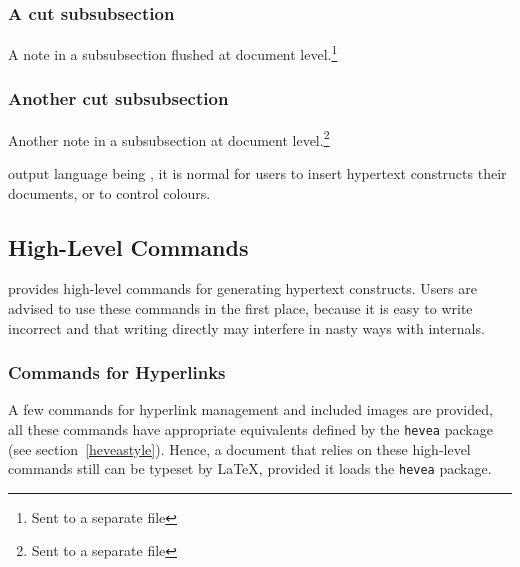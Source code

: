 \subsubsection{A cut subsubsection}
A note in a subsubsection flushed at document level.\footnote{Sent to a
separate file}
\subsubsection{Another cut subsubsection}
Another note in a subsubsection at document level.\footnote{Sent to
a separate file}
%
\cutend
\fi

\hevea{} output language being \html{}, it is normal for users to insert
hypertext constructs their documents, or to control colours.

\subsection{High-Level Commands}
\hevea{} provides high-level commands for generating
hypertext constructs.
Users are advised to use these commands in the first place,
because it is easy to write incorrect \html{} and that writing
\html{} directly may interfere in nasty ways with \hevea{} internals.


\subsubsection{Commands \label{hyperlink}for Hyperlinks}
A few commands for hyperlink  management and included images
are provided, all these
commands have appropriate equivalents defined by the \texttt{hevea}
package (see section~\ref{heveastyle}).
Hence, a document that relies on these high-level commands
still can be typeset by \LaTeX{}, provided it loads the \texttt{hevea}
package.

